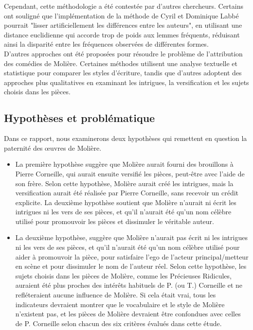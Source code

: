 \documentclass[]{report}
\begin{document}
\hspace{0,5cm}Cependant, cette méthodologie a été contestée par d'autres
chercheurs. Certains ont souligné que l'implémentation de la méthode de Cyril et
Dominique Labbé pourrait "lisser artificiellement les différences entre les
auteurs", en utilisant une distance euclidienne qui accorde trop de poids aux
lemmes fréquents, réduisant ainsi la disparité entre les fréquences observées de
différentes formes.  \\D'autres approches ont été proposées pour résoudre le
problème de l'attribution des comédies de Molière. Certaines méthodes utilisent
une analyse textuelle et statistique pour comparer les styles d'écriture, tandis
que d'autres adoptent des approches plus qualitatives en examinant les
intrigues, la versification et les sujets choisis dans les pièces.

\subsection{Hypothèses et problématique}
\vspace{\baselineskip}
\hspace{0,5cm} Dans ce rapport, nous examinerons deux hypothèses qui remettent
en question la paternité des œuvres de Molière.
\begin{itemize}
\item 	La première hypothèse suggère que Molière aurait fourni des brouillons à
Pierre Corneille, qui aurait ensuite versifié les pièces, peut-être avec l'aide
de son frère. Selon cette hypothèse, Molière aurait créé les intrigues, mais la
versification aurait été réalisée par Pierre Corneille, sans recevoir un crédit
explicite. La deuxième hypothèse soutient que Molière n'aurait ni écrit les
intrigues ni les vers de ses pièces, et qu'il n'aurait été qu'un nom célèbre
utilisé pour promouvoir les pièces et dissimuler le véritable auteur.
	
\item La deuxième hypothèse, suggère que Molière n'aurait pas écrit ni les
intrigues ni les vers de ses pièces, et qu'il n'aurait été qu'un nom célèbre
utilisé pour aider à promouvoir la pièce, pour satisfaire l'ego de l'acteur
principal/metteur en scène et pour dissimuler le nom de l'auteur réel. Selon
cette hypothèse, les sujets choisis dans les pièces de Molière, comme les
Précieuses Ridicules, auraient été plus proches des intérêts habituels de P. (ou
T.) Corneille et ne refléteraient aucune influence de Molière. Si cela était
vrai, tous les indicateurs devraient montrer que le vocabulaire et le style de
Molière n'existent pas, et les pièces de Molière devraient être confondues avec
celles de P. Corneille selon chacun des six critères évalués dans cette étude.
\end{itemize}
 
\end{document}

